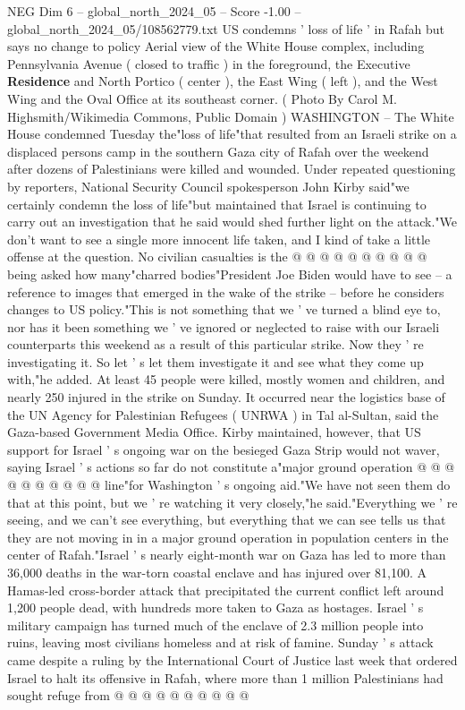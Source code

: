 \begin{textsample}{NEG Dim 6 – global\_north\_2024\_05 – Score -1.00 – global\_north\_2024\_05/108562779.txt}  \label{ex:f6_neg_290}
US condemns ' loss of life ' in Rafah but says no change to policy Aerial view of the White House complex, including Pennsylvania Avenue ( closed to traffic ) in the foreground, the Executive \textbf{Residence} and North Portico ( center ), the East Wing ( left ), and the West Wing and the Oval Office at its southeast corner. ( Photo By Carol M.
Highsmith/Wikimedia Commons, Public Domain ) WASHINGTON -- The White House condemned Tuesday the"loss of life"that resulted from an Israeli strike on a displaced persons camp in the southern Gaza city of Rafah over the weekend after dozens of Palestinians were killed and wounded.
Under repeated questioning by reporters, National Security Council spokesperson John Kirby said"we certainly condemn the loss of life"but maintained that Israel is continuing to carry out an investigation that he said would shed further light on the attack."We don't want to see a single more innocent life taken, and I kind of take a little offense at the question.
No civilian casualties is the @ @ @ @ @ @ @ @ @ @ being asked how many"charred bodies"President Joe Biden would have to see -- a reference to images that emerged in the wake of the strike -- before he considers changes to US policy."This is not something that we ' ve turned a blind eye to, nor has it been something we ' ve ignored or neglected to raise with our Israeli counterparts this weekend as a result of this particular strike.
Now they ' re investigating it.
So let ' s let them investigate it and see what they come up with,"he added.
At least 45 people were killed, mostly women and children, and nearly 250 injured in the strike on Sunday.
It occurred near the logistics base of the UN Agency for Palestinian Refugees ( UNRWA ) in Tal al-Sultan, said the Gaza-based Government Media Office.
Kirby maintained, however, that US support for Israel ' s ongoing war on the besieged Gaza Strip would not waver, saying Israel ' s actions so far do not constitute a"major ground operation @ @ @ @ @ @ @ @ @ @ line"for Washington ' s ongoing aid."We have not seen them do that at this point, but we ' re watching it very closely,"he said."Everything we ' re seeing, and we can't see everything, but everything that we can see tells us that they are not moving in in a major ground operation in population centers in the center of Rafah."Israel ' s nearly eight-month war on Gaza has led to more than 36,000 deaths in the war-torn coastal enclave and has injured over 81,100.
A Hamas-led cross-border attack that precipitated the current conflict left around 1,200 people dead, with hundreds more taken to Gaza as hostages.
Israel ' s military campaign has turned much of the enclave of 2.3 million people into ruins, leaving most civilians homeless and at risk of famine.
Sunday ' s attack came despite a ruling by the International Court of Justice last week that ordered Israel to halt its offensive in Rafah, where more than 1 million Palestinians had sought refuge from @ @ @ @ @ @ @ @ @ @

\end{textsample}
